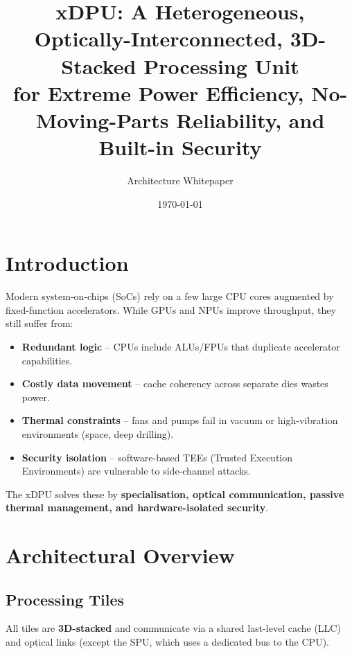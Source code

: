 \documentclass[10pt,twocolumn]{article}
\title{xDPU: A Heterogeneous, Optically-Interconnected, 3D-Stacked Processing Unit\\ 
\large for Extreme Power Efficiency, No-Moving-Parts Reliability, and Built-in Security}
\author{Architecture Whitepaper}
\date{\today}
\begin{document}

\section{Introduction}

Modern system-on-chips (SoCs) rely on a few large CPU cores augmented by fixed-function accelerators. While GPUs and NPUs improve throughput, they still suffer from:
\begin{itemize}
\item \textbf{Redundant logic} – CPUs include ALUs/FPUs that duplicate accelerator capabilities.
\item \textbf{Costly data movement} – cache coherency across separate dies wastes power.
\item \textbf{Thermal constraints} – fans and pumps fail in vacuum or high-vibration environments (space, deep drilling).
\item \textbf{Security isolation} – software-based TEEs (Trusted Execution Environments) are vulnerable to side-channel attacks.
\end{itemize}
The xDPU solves these by \textbf{specialisation, optical communication, passive thermal management, and hardware-isolated security}.

\section{Architectural Overview}

\subsection{Processing Tiles}
All tiles are \textbf{3D-stacked} and communicate via a shared last-level cache (LLC) and optical links (except the SPU, which uses a dedicated bus to the CPU).
\end{document}
